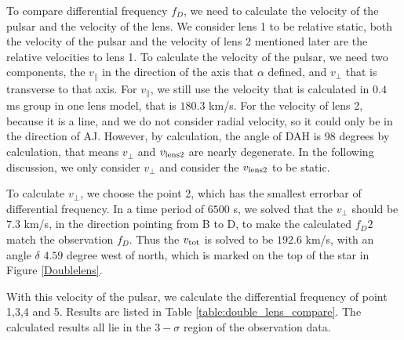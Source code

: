 \documentclass[useAMS,usenatbib]{mn2e}
\begin{document}
To compare differential frequency $f_D$, we need to calculate the velocity of the pulsar and the velocity of the lens. We consider lens 1 to be relative static, both the velocity of the pulsar and the velocity of lens 2 mentioned later are the relative velocities to lens 1.
To calculate the velocity of the pulsar, we need two components, the $v_{\parallel}$ in the direction of the axis that $\alpha$ defined, and $v_{\bot}$ that is transverse to that axis. For $v_{\parallel}$, we still use the velocity that is calculated in $0.4$ ms group in one lens model, that is $180.3$ km/s. For the velocity of lens 2, because it is a line, and we do not consider radial velocity, so it could only be in the direction of AJ. However, by calculation, the angle of DAH is 98 degrees by calculation, that means $v_{\bot}$ and $v_{\rm lens2}$ are nearly degenerate. In the following discussion, we only consider $v_{\bot}$ and consider the $v_{\rm lens2}$ to be static.

To calculate $v_{\bot}$, we choose the point 2, which has the smallest errorbar of differential frequency. In a time period of $6500$ s, we solved that the $v_{\bot}$ should be $7.3$ km/s, in the direction pointing from B to D, to make the calculated $f_D2$ match the observation $f_D$. Thus the $v_{\rm tot}$ is solved to be $192.6$ km/s, with an angle $\delta$ $4.59$ degree west of north, which is marked on the top of the star in Figure \ref{Doublelens}.

With this velocity of the pulsar, we calculate the differential frequency of point 1,3,4 and 5. Results are listed in Table \ref{table:double_lens_compare}. The calculated results all lie in the $3-\sigma$ region of the observation data. 

\end{document}
